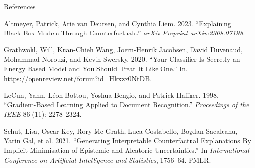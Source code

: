 \documentclass[
  ignorenonframetext,
]{beamer}
\newlength{\cslhangindent}
\newenvironment{CSLReferences}[2] %
 {\begin{list}{}{%
  \setlength{\itemindent}{0pt}
  \setlength{\leftmargin}{0pt}
  \setlength{\parsep}{0pt}
  \ifodd #1
   \setlength{\leftmargin}{\cslhangindent}
   \setlength{\itemindent}{-1\cslhangindent}
  \fi
  \setlength{\itemsep}{#2\baselineskip}}}
 {\end{list}}
\theoremstyle{definition}
\theoremstyle{remark}
\begin{document}
\begin{frame}{References}
\label{references}
\label{refs}
\begin{CSLReferences}{1}{0}
Altmeyer, Patrick, Arie van Deursen, and Cynthia Liem. 2023.
{``Explaining Black-Box Models Through Counterfactuals.''} \emph{arXiv
Preprint arXiv:2308.07198}.

Grathwohl, Will, Kuan-Chieh Wang, Joern-Henrik Jacobsen, David Duvenaud,
Mohammad Norouzi, and Kevin Swersky. 2020. {``Your Classifier Is
Secretly an Energy Based Model and You Should Treat It Like One.''} In.
\url{https://openreview.net/forum?id=Hkxzx0NtDB}.

LeCun, Yann, Léon Bottou, Yoshua Bengio, and Patrick Haffner. 1998.
{``Gradient-Based Learning Applied to Document Recognition.''}
\emph{Proceedings of the IEEE} 86 (11): 2278--2324.

Schut, Lisa, Oscar Key, Rory Mc Grath, Luca Costabello, Bogdan
Sacaleanu, Yarin Gal, et al. 2021. {``Generating {Interpretable
Counterfactual Explanations By Implicit Minimisation} of {Epistemic} and
{Aleatoric Uncertainties}.''} In \emph{International {Conference} on
{Artificial Intelligence} and {Statistics}}, 1756--64. {PMLR}.

\end{CSLReferences}
\end{frame}
\end{document}
